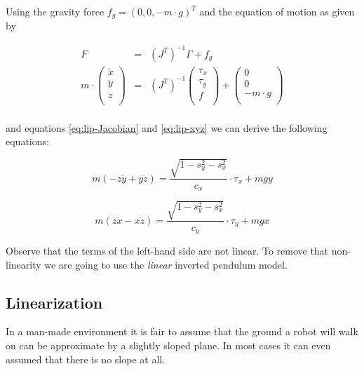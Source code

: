 \documentclass[english,ngerman]{KITreprt}
\begin{document}
Using the gravity force $f_g = (0, 0, -m \cdot g)^T$ and the equation of
motion as given by

\begin{equation}
\begin{array}{lcr}
F & = & (J^T)^{-1} \Gamma + f_g \\
m \cdot
\left(\begin{array}{c}
\ddot x \\
\ddot y \\
\ddot z \\
\end{array}\right)
& = & (J^T)^{-1}
\left(\begin{array}{c}
\tau_x \\
\tau_y \\
f \\
\end{array}\right)
+
\left(\begin{array}{c}
0 \\
0 \\
-m \cdot g \\
\end{array}\right) \\
\end{array}
\end{equation}

and equations \ref{eq:lip-Jacobian} and \ref{eq:lip-xyz} we can derive
the following equations:

\begin{equation} \label{eq:lip-dyn-y}
m(-z\ddot{y} + y\ddot{z}) = \frac{\sqrt{1 - s_y^2 - s_x^2}}{c_x} \cdot \tau_x + m g y
\end{equation}

\begin{equation} \label{eq:lip-dyn-x}
m(z\ddot{x} - x\ddot{z}) = \frac{\sqrt{1 - s_y^2 - s_x^2}}{c_y} \cdot \tau_y + m g x
\end{equation}

Observe that the terms of the left-hand side are not linear. To remove
that non-linearity we are going to use the \emph{linear} inverted
pendulum model.

\subsection{Linearization}\label{linearization}

In a man-made environment it is fair to assume that the ground a robot
will walk on can be approximate by a slightly sloped plane. In most
cases it can even assumed that there is no slope at all.
\end{document}
